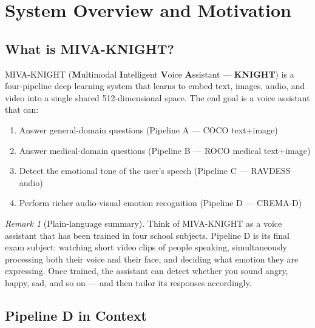 \documentclass[12pt,a4paper]{article}
\theoremstyle{definition}
\theoremstyle{remark}
\newtheorem{remark}[theorem]{Remark}
\begin{document}
\tableofcontents
\newpage

\section{System Overview and Motivation}

\subsection{What is MIVA-KNIGHT?}

MIVA-KNIGHT (\textbf{M}ultimodal \textbf{I}ntelligent \textbf{V}oice
\textbf{A}ssistant — \textbf{KNIGHT}) is a four-pipeline deep learning system
that learns to embed text, images, audio, and video into a single shared
512-dimensional space. The end goal is a voice assistant that can:
\begin{enumerate}
  \item Answer general-domain questions (Pipeline A — COCO text+image)
  \item Answer medical-domain questions (Pipeline B — ROCO medical text+image)
  \item Detect the emotional tone of the user's speech (Pipeline C — RAVDESS audio)
  \item Perform richer audio-visual emotion recognition (Pipeline D — CREMA-D)
\end{enumerate}

\begin{remark}[Plain-language summary]
Think of MIVA-KNIGHT as a voice assistant that has been trained in four
school subjects. Pipeline D is its final exam subject: watching short video
clips of people speaking, simultaneously processing both their voice and their
face, and deciding what emotion they are expressing. Once trained, the assistant
can detect whether you sound angry, happy, sad, and so on — and then tailor
its responses accordingly.
\end{remark}

\subsection{Pipeline D in Context}
\end{document}

